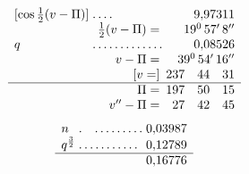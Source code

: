 \[
\begin{array}{l@{\;}l@{\;}r}
[\cos\frac{1}{2}(v-\Pi)]&\mathord{.}\,\mathord{.}\,\mathord{.}\,\mathord{.}&9{,}97311\\
\multicolumn{2}{r}{\frac{1}{2}(v-\Pi)=}&19^{0}\,57'\,8''\\
q&\mathord{.}\,\mathord{.}\,\mathord{.}\,\mathord{.}\,\mathord{.}\,\mathord{.}\,\mathord{.}\,\mathord{.}\,\mathord{.}\,\mathord{.}\,\mathord{.}\,\mathord{.}\,\mathord{.}&0{,}08526\\
\multicolumn{2}{r}{v-\Pi=}&39^{0}\,54'\,16''\\
\multicolumn{2}{r}{[v=]}&237\quad44\quad31\\\hline
\multicolumn{2}{r}{\Pi=}&197\quad50\quad15\\
\multicolumn{2}{r}{v''-\Pi=}&27\quad42\quad45
\end{array}
\]
\[
\begin{array}{l@{\;}l@{\;}r}
n&\mathord{.}\quad\mathord{.}\,\mathord{.}\,\mathord{.}\,\mathord{.}\,\mathord{.}\,\mathord{.}\,\mathord{.}\,\mathord{.}\,\mathord{.}&0{,}03987\\
q^{\frac{3}{2}}&\mathord{.}\,\mathord{.}\,\mathord{.}\,\mathord{.}\,\mathord{.}\,\mathord{.}\,\mathord{.}\,\mathord{.}\,\mathord{.}\,\mathord{.}\,\mathord{.}&0{,}12789\\\hline
&&0{,}16776
\end{array}
\]
